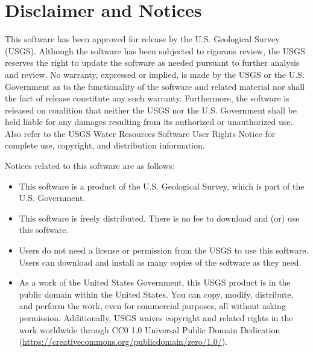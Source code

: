 \documentclass[11pt,twoside,twocolumn]{usgsreport}
\makeatletter
\newcommand{\customlabel}[2]{%
   \protected@write \@auxout {}{\string \newlabel {#1}{{#2}{\thepage}{#2}{#1}{}} }%
   \hypertarget{#1}{}
}
\newcommand{\inreferences}{%
\renewcommand{\theequation}{R--\arabic{equation}}%
\setcounter{equation}{0}%
\renewcommand{\thefigure}{R--\arabic{figure}}%
\setcounter{figure}{0}%
\renewcommand{\thetable}{R--\arabic{table}}%
\setcounter{table}{0}%
\renewcommand{\thepage}{R--\arabic{page}}%
\setcounter{page}{1}%
}
\newcounter{appendixno}
\newcommand{\inappendix}{%
\addtocounter{appendixno}{1}%
\renewcommand{\theequation}{\Alph{appendixno}--\arabic{equation}}%
\setcounter{equation}{0}%
\renewcommand{\thefigure}{\Alph{appendixno}--\arabic{figure}}%
\setcounter{figure}{0}%
\renewcommand{\thetable}{\Alph{appendixno}--\arabic{table}}%
\setcounter{table}{0}%
\renewcommand{\thepage}{\Alph{appendixno}--\arabic{page}}%
\setcounter{page}{1}%
}
\makeatother
\begin{document}
\section{Disclaimer and Notices}

This software has been approved for release by the U.S. Geological Survey (USGS). Although the software has been subjected to rigorous review, the USGS reserves the right to update the software as needed pursuant to further analysis and review. No warranty, expressed or implied, is made by the USGS or the U.S. Government as to the functionality of the software and related material nor shall the fact of release constitute any such warranty. Furthermore, the software is released on condition that neither the USGS nor the U.S. Government shall be held liable for any damages resulting from its authorized or unauthorized use. Also refer to the USGS Water Resources Software User Rights Notice for complete use, copyright, and distribution information.

Notices related to this software are as follows:
\begin{itemize}
\item This software is a product of the U.S. Geological Survey, which is part of the U.S. Government.

\item This software is freely distributed. There is no fee to download and (or) use this software.

\item Users do not need a license or permission from the USGS to use this software. Users can download and install as many copies of the software as they need.

\item As a work of the United States Government, this USGS product is in the public domain within the United States. You can copy, modify, distribute, and perform the work, even for commercial purposes, all without asking permission. Additionally, USGS waives copyright and related rights in the work worldwide through CC0 1.0 Universal Public Domain Dedication (\url{https://creativecommons.org/publicdomain/zero/1.0/}).
\end{itemize}


\newpage
\ifx\usgsdirector\undefined
{}
\else
\inreferences
\REFSECTION
\fi



\newpage
\inappendix
{}
\customlabel{app:A}{A}



\justifying
\vspace*{\fill}
\clearpage
\pagestyle{backofreport}
\makebackcover
\end{document}
